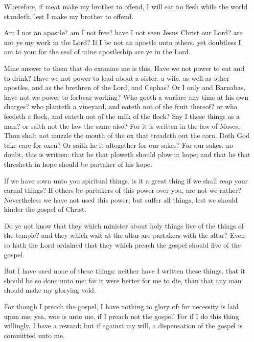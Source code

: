 \Verse Wherefore, if meat make my brother to offend, I will eat no flesh while the world standeth, lest I make my brother to offend.


\Chapter
\Verse Am I not an apostle? am I not free? have I not seen Jesus Christ our Lord? are not ye my work in the Lord?  \Verse If I be not an apostle unto others, yet doubtless I am to you: for the seal of mine apostleship are ye in the Lord.

\Verse Mine answer to them that do examine me is this, \Verse Have we not power to eat and to drink?  \Verse Have we not power to lead about a sister, a wife, as well as other apostles, and as the brethren of the Lord, and Cephas?  \Verse Or I only and Barnabas, have not we power to forbear working?  \Verse Who goeth a warfare any time at his own charges?  who planteth a vineyard, and eateth not of the fruit thereof? or who feedeth a flock, and eateth not of the milk of the flock?  \Verse Say I these things as a man? or saith not the law the same also?  \Verse For it is written in the law of Moses, Thou shalt not muzzle the mouth of the ox that treadeth out the corn. Doth God take care for oxen?  \Verse Or saith he it altogether for our sakes? For our sakes, no doubt, this is written: that he that ploweth should plow in hope; and that he that thresheth in hope should be partaker of his hope.

\Verse If we have sown unto you spiritual things, is it a great thing if we shall reap your carnal things?  \Verse If others be partakers of this power over you, are not we rather?  Nevertheless we have not used this power; but suffer all things, lest we should hinder the gospel of Christ.

\Verse Do ye not know that they which minister about holy things live of the things of the temple? and they which wait at the altar are partakers with the altar?  \Verse Even so hath the Lord ordained that they which preach the gospel should live of the gospel.

\Verse But I have used none of these things: neither have I written these things, that it should be so done unto me: for it were better for me to die, than that any man should make my glorying void.

\Verse For though I preach the gospel, I have nothing to glory of: for necessity is laid upon me; yea, woe is unto me, if I preach not the gospel!  \Verse For if I do this thing willingly, I have a reward: but if against my will, a dispensation of the gospel is committed unto me.

